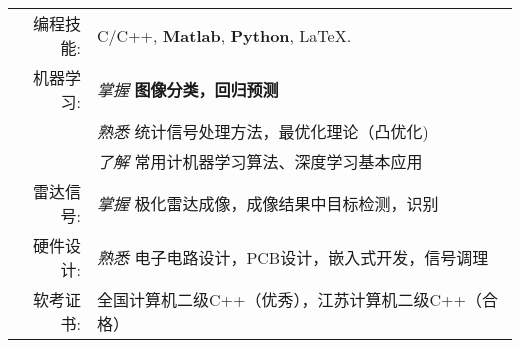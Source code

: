 %
%


 
\renewcommand{\arraystretch}{1.1}

	\begin{tabular}{>{}r>{}p{13cm}} 
		\textsc{编程技能:}      &  C/C++, \textbf{Matlab}, \textbf{Python}, \LaTeX.\\  
		\textsc{机器学习:} 		&  \emph{掌握} \textbf{图像分类，回归预测} \\
 							&  \emph{熟悉}  统计信号处理方法，最优化理论（凸优化)\\
							&  \emph{了解}  常用计机器学习算法、深度学习基本应用 \\
							  
		\textsc{雷达信号:}	   &  \emph{掌握}  极化雷达成像，成像结果中目标检测，识别  \\
		\textsc{硬件设计:}	   &  \emph{熟悉}  电子电路设计，PCB设计，嵌入式开发，信号调理  \\
		\textsc{软考证书:}	    &  全国计算机二级C++（优秀），江苏计算机二级C++（合格）\\
	\end{tabular}
	
